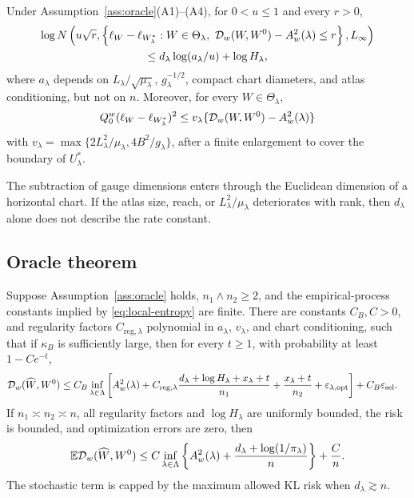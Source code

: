 \begin{lemma}
\label{lem:entropy}
Under Assumption~\ref{ass:oracle}(A1)--(A4), for \(0<u\le1\) and every \(r>0\),
\begin{multline}
\log N\left(
u\sqrt r,
\left\{\ell_W-\ell_{W_\lambda^*}:
W\in\Theta_\lambda,
\ \mathcal D_w(W,W^0)-A_w^2(\lambda)\le r\right\},
L_\infty
\right)\\
\le d_\lambda\log(a_\lambda/u)+\log H_\lambda,
\label{eq:local-entropy}
\end{multline}
where \(a_\lambda\) depends on \(L_\lambda/\sqrt{\mu_\lambda}\), \(g_\lambda^{-1/2}\), compact chart diameters, and atlas conditioning, but not on \(n\). Moreover, for every \(W\in\Theta_\lambda\),
\[
Q_0^w(\ell_W-\ell_{W_\lambda^*})^2
\le v_\lambda
\{\mathcal D_w(W,W^0)-A_w^2(\lambda)\}
\]
with \(v_\lambda=\max\{2L_\lambda^2/\mu_\lambda,4B^2/g_\lambda\}\), after a finite enlargement to cover the boundary of \(U_\lambda^*\).
\end{lemma}

The subtraction of gauge dimensions enters through the Euclidean dimension of a horizontal chart. If the atlas size, reach, or \(L_\lambda^2/\mu_\lambda\) deteriorates with rank, then \(d_\lambda\) alone does not describe the rate constant.

\subsection{Oracle theorem}

\begin{theorem}
\label{thm:oracle}
Suppose Assumption~\ref{ass:oracle} holds, \(n_1\wedge n_2\ge2\), and the empirical-process constants implied by \cref{eq:local-entropy} are finite. There are constants \(C_B,C>0\), and regularity factors \(C_{\mathrm{reg},\lambda}\) polynomial in \(a_\lambda\), \(v_\lambda\), and chart conditioning, such that if \(\kappa_B\) is sufficiently large, then for every \(t\ge1\), with probability at least \(1-Ce^{-t}\),
\begin{align}
\mathcal D_w(\widehat W,W^0)
\le C_B\inf_{\lambda\in\Lambda}\bigg[&A_w^2(\lambda)
+C_{\mathrm{reg},\lambda}
\frac{d_\lambda+\log H_\lambda+x_\lambda+t}{n_1}
+\frac{x_\lambda+t}{n_2}
+\varepsilon_{\lambda,\mathrm{opt}}\bigg]
+C_B\varepsilon_{\mathrm{sel}}.
\label{eq:oracle-hp}
\end{align}
If \(n_1\asymp n_2\asymp n\), all regularity factors and \(\log H_\lambda\) are uniformly bounded, the risk is bounded, and optimization errors are zero, then
\begin{equation}
\mathbb E\mathcal D_w(\widehat W,W^0)
\le C\inf_{\lambda\in\Lambda}
\left\{A_w^2(\lambda)+
\frac{d_\lambda+\log(1/\pi_\lambda)}{n}\right\}
+\frac Cn.
\label{eq:oracle-expectation}
\end{equation}
The stochastic term is capped by the maximum allowed KL risk when \(d_\lambda\gtrsim n\).
\end{theorem}


